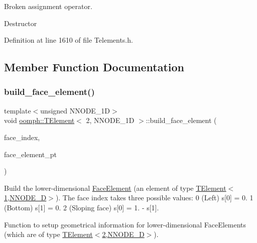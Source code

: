 Broken assignment operator. 

Destructor 

Definition at line 1610 of file Telements.\+h.



\subsection{Member Function Documentation}
\mbox{\label{classoomph_1_1TElement_3_012_00_01NNODE__1D_01_4_adf9dd8fa1e2dedc481adfea443e8a926}} 
\subsubsection{\texorpdfstring{build\+\_\+face\+\_\+element()}{build\_face\_element()}}
{\footnotesize\ttfamily template$<$unsigned N\+N\+O\+D\+E\+\_\+1D$>$ \\
void \hyperlink{classoomph_1_1TElement}{oomph\+::\+T\+Element}$<$ 2, N\+N\+O\+D\+E\+\_\+1D $>$\+::build\+\_\+face\+\_\+element (\begin{DoxyParamCaption}\item[{const int \&}]{face\+\_\+index,  }\item[{\hyperlink{classoomph_1_1FaceElement}{Face\+Element} $\ast$}]{face\+\_\+element\+\_\+pt }\end{DoxyParamCaption})\hspace{0.3cm}{\ttfamily [virtual]}}



Build the lower-\/dimensional \hyperlink{classoomph_1_1FaceElement}{Face\+Element} (an element of type \hyperlink{classoomph_1_1TElement_3_011_00_01NNODE__1D_01_4}{T\+Element$<$1,\+N\+N\+O\+D\+E\+\_\+D$>$}). The face index takes three possible values\+: 0 (Left) s\mbox{[}0\mbox{]} = 0. 1 (Bottom) s\mbox{[}1\mbox{]} = 0. 2 (Sloping face) s\mbox{[}0\mbox{]} = 1. -\/ s\mbox{[}1\mbox{]}. 

Function to setup geometrical information for lower-\/dimensional Face\+Elements (which are of type \hyperlink{classoomph_1_1TElement_3_012_00_01NNODE__1D_01_4}{T\+Element$<$2,\+N\+N\+O\+D\+E\+\_\+D$>$}). 

